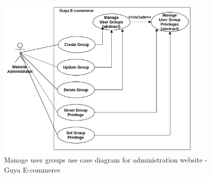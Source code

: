 \begin{figure}[!ht]
\centering
\includegraphics[width=10cm,keepaspectratio]{usecases/manage_user_groups_usecase}
\caption{Manage user groups use case diagram for administration website - Guya E-commerce}
\end{figure}
